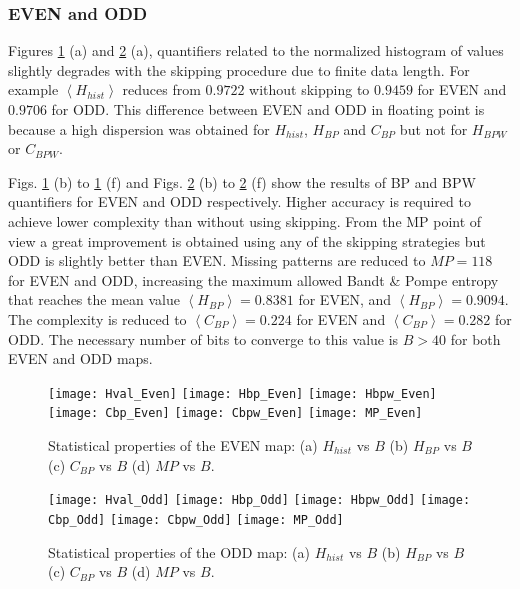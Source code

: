 \subsubsection{EVEN and ODD} \label{sssec:skipp}

Figures \ref{fig:EVEN_QuantiB} (a) and \ref{fig:ODD_QuantiB} (a), quantifiers related to the normalized histogram of values slightly degrades with the skipping procedure due to finite data length.
For example $\left\langle H_{hist}\right\rangle $ reduces from $0.9722$ without skipping to $0.9459$ for EVEN and $0.9706$ for ODD. 
This difference between EVEN and ODD in floating point is because a high dispersion was obtained for $H_{hist}$, $H_{BP}$ and $C_{BP}$ but not for $H_{BPW}$ or $C_{BPW}$.

Figs. \ref{fig:EVEN_QuantiB} (b) to \ref{fig:EVEN_QuantiB} (f) and Figs. \ref{fig:ODD_QuantiB} (b) to \ref{fig:ODD_QuantiB} (f) show the results of BP and BPW quantifiers for EVEN and ODD respectively.
Higher accuracy is required to achieve lower complexity than without using skipping.
From the MP point of view a great improvement is obtained using any of the skipping strategies but ODD is slightly better than EVEN.
Missing patterns are reduced to $MP = 118$ for EVEN and ODD, increasing the maximum allowed Bandt \& Pompe entropy that reaches the mean value $\left\langle H_{BP}\right\rangle  = 0.8381$ for EVEN, and $\left\langle H_{BP}\right\rangle  = 0.9094$.
The complexity is reduced to $\left\langle C_{BP}\right\rangle = 0.224$ for EVEN and $\left\langle C_{BP}\right\rangle = 0.282$ for ODD.
The necessary number of bits to converge to this value is $B>40$ for both EVEN and ODD maps.

\begin{figure}
	\texttt{[image: Hval\_Even]}
	\texttt{[image: Hbp\_Even]}
	\texttt{[image: Hbpw\_Even]}
	\texttt{[image: Cbp\_Even]}
	\texttt{[image: Cbpw\_Even]}
	\texttt{[image: MP\_Even]}
	\caption{Statistical properties of the EVEN map: (a) $H_{hist}$ vs $B$ (b) $H_{BP}$ vs $B$ (c) $C_{BP}$ vs $B$ (d) $MP$ vs $B$.}
	\label{fig:EVEN_QuantiB}
\end{figure}

\begin{figure}
	\texttt{[image: Hval\_Odd]}
	\texttt{[image: Hbp\_Odd]}
	\texttt{[image: Hbpw\_Odd]}
	\texttt{[image: Cbp\_Odd]}
	\texttt{[image: Cbpw\_Odd]}
	\texttt{[image: MP\_Odd]}
	\caption{Statistical properties of the ODD map: (a) $H_{hist}$ vs $B$ (b) $H_{BP}$ vs $B$ (c) $C_{BP}$ vs $B$ (d) $MP$ vs $B$.}
	\label{fig:ODD_QuantiB}
	\end{figure}

